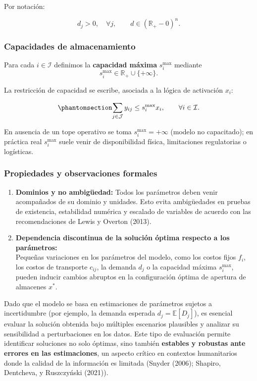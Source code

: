 \documentclass[
  spanish,
  us-letterpaper,
  DIV=11,
  numbers=noendperiod]{scrreprt}
\numberwithin{equation}{section}
\begin{document}
Por notación:

\[
d_j>0,\quad \forall j,\qquad d\in(\mathbb{R}_{+}-{0})^n.
\]

\subsubsection{Capacidades de
almacenamiento}\label{capacidades-de-almacenamiento}

Para cada \(i\in\mathcal{I}\) definimos la \textbf{capacidad máxima}
\(s_i^{\max}\) mediante \[
s_i^{\max}\in\mathbb{R}_{+}\cup\{+\infty\}.
\]

La restricción de capacidad se escribe, asociada a la lógica de
activación \(x_i\):

\begin{equation}\phantomsection\label{eq-restriccion}{
\sum_{j\in\mathcal{J}} y_{ij} \le s_i^{\max} x_i,\qquad \forall i\in\mathcal{I}.
}\end{equation}

En ausencia de un tope operativo se toma \(s_i^{\max}=+\infty\) (modelo
no capacitado); en práctica real \(s_i^{\max}\) suele venir de
disponibilidad física, limitaciones regulatorias o logísticas.

\subsubsection{Propiedades y observaciones
formales}\label{propiedades-y-observaciones-formales}

\begin{enumerate}
\def\labelenumi{\arabic{enumi}.}
\item
  \textbf{Dominios y no ambigüedad:} Todos los parámetros deben venir
  acompañados de su dominio y unidades. Esto evita ambigüedades en
  pruebas de existencia, estabilidad numérica y escalado de variables de
  acuerdo con las recomendaciones de Lewis y Overton (2013).
\item
  \textbf{Dependencia discontinua de la solución óptima respecto a los
  parámetros:}\\
  Pequeñas variaciones en los parámetros del modelo, como los costos
  fijos \(f_i\), los costos de transporte \(c_{ij}\), la demanda \(d_j\)
  o la capacidad máxima \(s_i^{\max}\), pueden inducir cambios abruptos
  en la configuración óptima de apertura de almacenes \(x^*\).
\end{enumerate}

Dado que el modelo se basa en estimaciones de parámetros sujetos a
incertidumbre (por ejemplo, la demanda esperada
\(d_j = \mathbb{E}[D_j]\)), es esencial evaluar la solución obtenida
bajo múltiples escenarios plausibles y analizar su sensibilidad a
perturbaciones en los datos. Este tipo de evaluación permite identificar
soluciones no solo óptimas, sino también \textbf{estables y robustas
ante errores en las estimaciones}, un aspecto crítico en contextos
humanitarios donde la calidad de la información es limitada (Snyder
(2006); Shapiro, Dentcheva, y Ruszczyński (2021)).
\end{document}
